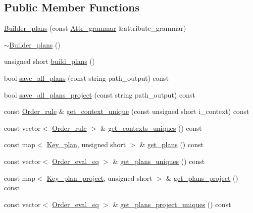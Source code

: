 \subsection*{Public Member Functions}
\begin{DoxyCompactItemize}
\item 
\hyperlink{classgenevalmag_1_1Builder__plans_abd168919b4dfc51ed9c400f5afac0043}{Builder\_\-plans} (const \hyperlink{classgenevalmag_1_1Attr__grammar}{Attr\_\-grammar} \&attribute\_\-grammar)
\item 
\hyperlink{classgenevalmag_1_1Builder__plans_af19ca3bf57580ee40b317e119cacdc66}{$\sim$Builder\_\-plans} ()
\item 
unsigned short \hyperlink{classgenevalmag_1_1Builder__plans_a3337ccac1c358d9b0a1de456ff74b0cb}{build\_\-plans} ()
\item 
bool \hyperlink{classgenevalmag_1_1Builder__plans_aa15ea4156613c75cfca5ecc0bd6a5193}{save\_\-all\_\-plans} (const string path\_\-output) const 
\item 
bool \hyperlink{classgenevalmag_1_1Builder__plans_a7017816e03c141df9dbdb55f3f8f896c}{save\_\-all\_\-plans\_\-project} (const string path\_\-output) const 
\item 
const \hyperlink{namespacegenevalmag_aed20da32fb9692645ae53d911d274fd5}{Order\_\-rule} \& \hyperlink{classgenevalmag_1_1Builder__plans_a72ef4716a24888c994c1b0a5c70b88a8}{get\_\-context\_\-unique} (const unsigned short i\_\-context) const 
\item 
const vector$<$ \hyperlink{namespacegenevalmag_aed20da32fb9692645ae53d911d274fd5}{Order\_\-rule} $>$ \& \hyperlink{classgenevalmag_1_1Builder__plans_a72a79884798342895b1b0779a1938031}{get\_\-contexts\_\-uniques} () const 
\item 
const map$<$ \hyperlink{structgenevalmag_1_1k__plan}{Key\_\-plan}, unsigned short $>$ \& \hyperlink{classgenevalmag_1_1Builder__plans_a75890521873bd1f8bee15799d820d755}{get\_\-plans} () const 
\item 
const vector$<$ \hyperlink{namespacegenevalmag_a0bb2e8b0fa1b07b873f0363719de7b64}{Order\_\-eval\_\-eq} $>$ \& \hyperlink{classgenevalmag_1_1Builder__plans_ad5d96d5e07170749447ff69b3282cd3d}{get\_\-plans\_\-uniques} () const 
\item 
const map$<$ \hyperlink{structgenevalmag_1_1k__p__project}{Key\_\-plan\_\-project}, unsigned short $>$ \& \hyperlink{classgenevalmag_1_1Builder__plans_a011e4668e269c69022cae075075a0087}{get\_\-plans\_\-project} () const 
\item 
const vector$<$ \hyperlink{namespacegenevalmag_a0bb2e8b0fa1b07b873f0363719de7b64}{Order\_\-eval\_\-eq} $>$ \& \hyperlink{classgenevalmag_1_1Builder__plans_aa4f340be44a4b2592c8f5aaabf88305e}{get\_\-plans\_\-project\_\-uniques} () const 

\end{DoxyCompactItemize}
